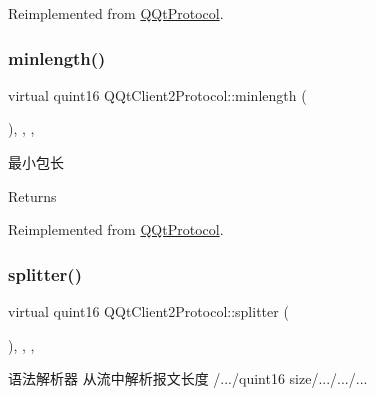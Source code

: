 Reimplemented from \mbox{\hyperlink{class_q_qt_protocol_af41bc3116abbbcfc9af45e151a253ff7}{Q\+Qt\+Protocol}}.

\mbox{\label{class_q_qt_client2_protocol_abf17d8d38925c2e9ab9bac4f6bf00223}} 
\subsubsection{\texorpdfstring{minlength()}{minlength()}}
{\footnotesize\ttfamily virtual quint16 Q\+Qt\+Client2\+Protocol\+::minlength (\begin{DoxyParamCaption}{ }\end{DoxyParamCaption})\hspace{0.3cm}{\ttfamily [inline]}, {\ttfamily [override]}, {\ttfamily [protected]}, {\ttfamily [virtual]}}



最小包长 

\begin{DoxyReturn}{Returns}

\end{DoxyReturn}


Reimplemented from \mbox{\hyperlink{class_q_qt_protocol_a2b00f53d3dd0eed817eeecff422891f3}{Q\+Qt\+Protocol}}.

\mbox{\label{class_q_qt_client2_protocol_ad5c123b096a1b1bc13bf1f1db22df4e2}} 
\subsubsection{\texorpdfstring{splitter()}{splitter()}}
{\footnotesize\ttfamily virtual quint16 Q\+Qt\+Client2\+Protocol\+::splitter (\begin{DoxyParamCaption}\item[{const Q\+Byte\+Array \&}]{ }\end{DoxyParamCaption})\hspace{0.3cm}{\ttfamily [inline]}, {\ttfamily [override]}, {\ttfamily [protected]}, {\ttfamily [virtual]}}



语法解析器 从流中解析报文长度 /.../quint16 size/.../.../... 


